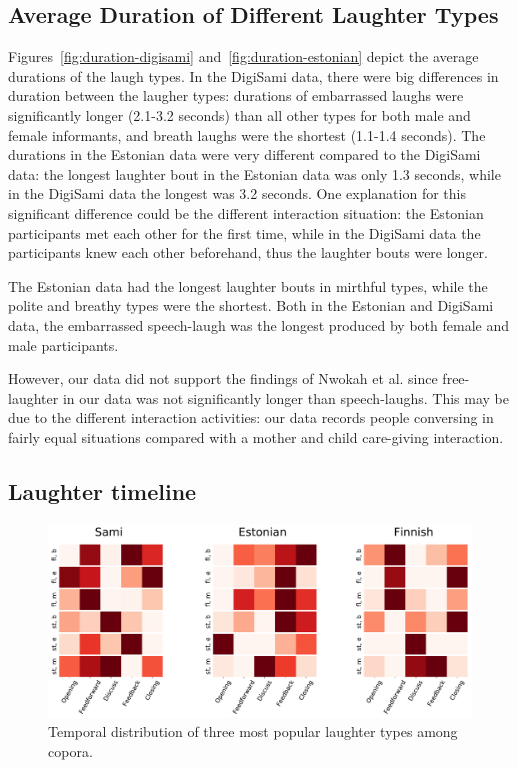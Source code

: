 \documentclass[10pt,journal,compsoc]{IEEEtran}
\begin{document}
\subsection{Average Duration of Different Laughter Types}

Figures~\ref{fig:duration-digisami} and~\ref{fig:duration-estonian} depict the average durations of the laugh types. In the DigiSami data, there were big differences in duration between the laugher types: durations of embarrassed laughs were significantly longer (2.1-3.2 seconds) than all other types for both male and female informants, and breath laughs were the shortest (1.1-1.4 seconds). The durations in the Estonian data were very different compared to the DigiSami data: the longest laughter bout in the Estonian data was only 1.3 seconds, while in the DigiSami data the longest was 3.2 seconds. One explanation for this significant difference could be the different interaction situation: the Estonian participants met each other for the first time, while in the DigiSami data the participants knew each other beforehand, thus the laughter bouts were longer.

The Estonian data had the longest laughter bouts in mirthful types, while the polite and breathy types were the shortest. Both in the Estonian and DigiSami data, the embarrassed speech-laugh was the longest produced by both female and male participants.

However, our data did not support the findings of Nwokah et al. \cite{Nwokah:ea:99} since free-laughter in our data was not significantly longer than speech-laughs. This may be due to the different interaction activities: our data records people conversing in fairly equal situations compared with a mother and child care-giving interaction.

\subsection{Laughter timeline}

\begin{figure}[!t]
\centering
\includegraphics[width=0.88\linewidth]{figures/timeline.pdf}
\caption{Temporal distribution of three most popular laughter types among copora.}
\label{fig:laugh-timeline}
\end{figure}
\end{document}

